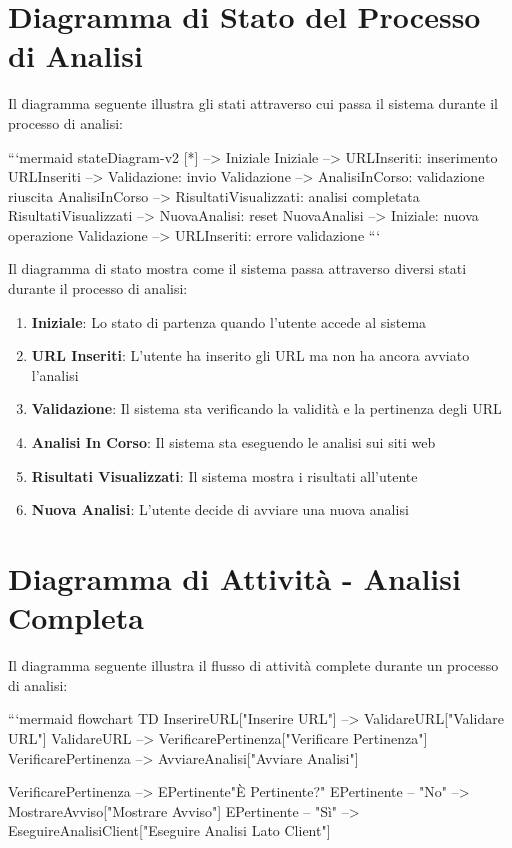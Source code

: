 \section{Diagramma di Stato del Processo di Analisi}
Il diagramma seguente illustra gli stati attraverso cui passa il sistema durante il processo di analisi:

```mermaid
stateDiagram-v2
    [*] --> Iniziale
    Iniziale --> URLInseriti: inserimento
    URLInseriti --> Validazione: invio
    Validazione --> AnalisiInCorso: validazione riuscita
    AnalisiInCorso --> RisultatiVisualizzati: analisi completata
    RisultatiVisualizzati --> NuovaAnalisi: reset
    NuovaAnalisi --> Iniziale: nuova operazione
    Validazione --> URLInseriti: errore validazione
```

Il diagramma di stato mostra come il sistema passa attraverso diversi stati durante il processo di analisi:

\begin{enumerate}
    \item \textbf{Iniziale}: Lo stato di partenza quando l'utente accede al sistema
    \item \textbf{URL Inseriti}: L'utente ha inserito gli URL ma non ha ancora avviato l'analisi
    \item \textbf{Validazione}: Il sistema sta verificando la validità e la pertinenza degli URL
    \item \textbf{Analisi In Corso}: Il sistema sta eseguendo le analisi sui siti web
    \item \textbf{Risultati Visualizzati}: Il sistema mostra i risultati all'utente
    \item \textbf{Nuova Analisi}: L'utente decide di avviare una nuova analisi
\end{enumerate}

\section{Diagramma di Attività - Analisi Completa}
Il diagramma seguente illustra il flusso di attività complete durante un processo di analisi:

```mermaid
flowchart TD
    InserireURL["Inserire URL"] --> ValidareURL["Validare URL"]
    ValidareURL --> VerificarePertinenza["Verificare Pertinenza"]
    VerificarePertinenza --> AvviareAnalisi["Avviare Analisi"]
    
    VerificarePertinenza --> EPertinente{"È Pertinente?"}
    EPertinente -- "No" --> MostrareAvviso["Mostrare Avviso"]
    EPertinente -- "Sì" --> EseguireAnalisiClient["Eseguire Analisi Lato Client"]
    
